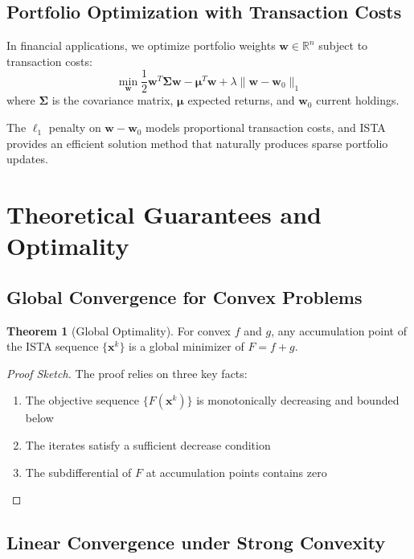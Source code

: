 \documentclass[12pt]{article}
\renewcommand{\vec}[1]{\mathbf{#1}}
\newcommand{\norm}[1]{\lVert #1 \rVert}
\newcommand{\R}{\mathbb{R}}
\theoremstyle{definition}
\newtheorem{theorem}{Theorem}[section]
\begin{document}
\subsection{Portfolio Optimization with Transaction Costs}

In financial applications, we optimize portfolio weights $\vec{w} \in \R^n$ subject to transaction costs:
\begin{equation}
    \min_{\vec{w}} \frac{1}{2}\vec{w}^T\vec{\Sigma}\vec{w} - \vec{\mu}^T\vec{w} + \lambda\norm{\vec{w} - \vec{w}_0}_1
\end{equation}
where $\vec{\Sigma}$ is the covariance matrix, $\vec{\mu}$ expected returns, and $\vec{w}_0$ current holdings.

The $\ell_1$ penalty on $\vec{w} - \vec{w}_0$ models proportional transaction costs, and ISTA provides an efficient solution method that naturally produces sparse portfolio updates.

\newpage
\section{Theoretical Guarantees and Optimality}

\subsection{Global Convergence for Convex Problems}

\begin{theorem}[Global Optimality]\label{thm:global}
    For convex $f$ and $g$, any accumulation point of the ISTA sequence $\{\vec{x}^k\}$ is a global minimizer of $F = f + g$.
\end{theorem}

\begin{proof}[Proof Sketch]
    The proof relies on three key facts:
    \begin{enumerate}
        \item The objective sequence $\{F(\vec{x}^k)\}$ is monotonically decreasing and bounded below
        \item The iterates satisfy a sufficient decrease condition
        \item The subdifferential of $F$ at accumulation points contains zero
    \end{enumerate}
\end{proof}

\subsection{Linear Convergence under Strong Convexity}
\end{document}

